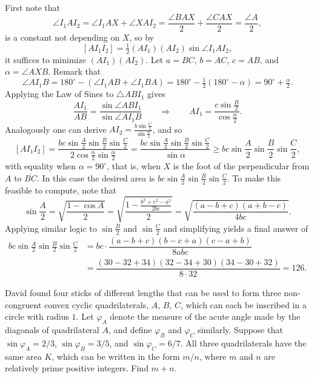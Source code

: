 \begin{solution}[name={Solution by David Altizio}]
	First note that\[\angle I_1AI_2 = \angle I_1AX + \angle XAI_2 = \frac{\angle BAX}2 + \frac{\angle CAX}2 = \frac{\angle A}2,\]is a constant not depending on $X$, so by $$[AI_1I_2] = \tfrac12(AI_1)(AI_2)\sin\angle I_1AI_2,$$ it suffices to minimize $(AI_1)(AI_2)$. Let $a = BC$, $b = AC$, $c = AB$, and $\alpha = \angle AXB$. Remark that\[\angle AI_1B = 180^\circ - (\angle I_1AB + \angle I_1BA) = 180^\circ - \tfrac12(180^\circ - \alpha) = 90^\circ + \tfrac\alpha 2.\]Applying the Law of Sines to $\triangle ABI_1$ gives\[\frac{AI_1}{AB} = \frac{\sin\angle ABI_1}{\sin\angle AI_1B}\qquad\Rightarrow\qquad AI_1 = \frac{c\sin\frac B2}{\cos\frac\alpha 2}.\]Analogously one can derive $AI_2 = \tfrac{b\sin\frac C2}{\sin\frac\alpha 2}$, and so\[[AI_1I_2] = \frac{bc\sin\frac A2 \sin\frac B2\sin\frac C2}{2\cos\frac\alpha 2\sin\frac\alpha 2} = \frac{bc\sin\frac A2 \sin\frac B2\sin\frac C2}{\sin\alpha}\geq bc\sin\frac A2 \sin\frac B2\sin\frac C2,\]with equality when $\alpha = 90^\circ$, that is, when $X$ is the foot of the perpendicular from $A$ to $\overline{BC}$. In this case the desired area is $bc\sin\tfrac A2\sin\tfrac B2\sin\tfrac C2$. To make this feasible to compute, note that\[\sin\frac A2=\sqrt{\frac{1-\cos A}2}=\sqrt{\frac{1-\frac{b^2+c^2-a^2}{2bc}}2} = \sqrt{\dfrac{(a-b+c)(a+b-c)}{4bc}}.\]Applying similar logic to $\sin \tfrac B2$ and $\sin\tfrac C2$ and simplifying yields a final answer of
	\begin{align*}
		bc\sin\frac A2\sin\frac B2\sin\frac C2&=bc\cdot\dfrac{(a-b+c)(b-c+a)(c-a+b)}{8abc}\\&=\dfrac{(30-32+34)(32-34+30)(34-30+32)}{8\cdot 32}=\boxed{126}.
	\end{align*}
\end{solution}










\begin{question}[name={2018 AIME I, \href{https://artofproblemsolving.com/community/c4p9995439}{Problem 15}}]
	David found four sticks of different lengths that can be used to form three non-congruent convex cyclic quadrilaterals, \(A\), \(B\), \(C\), which can each be inscribed in a circle with radius \(1\). Let \(\varphi_A\) denote the measure of the acute angle made by the diagonals of quadrilateral \(A\), and define \(\varphi_B\) and \(\varphi_C\) similarly. Suppose that \(\sin\varphi_A={2}/{3}\), \(\sin\varphi_B={3}/{5}\), and \(\sin\varphi_C={6}/{7}\). All three quadrilaterals have the same area \(K\), which can be written in the form \({m}/{n}\), where \(m\) and \(n\) are relatively prime positive integers. Find \(m+n\).
\end{question}


